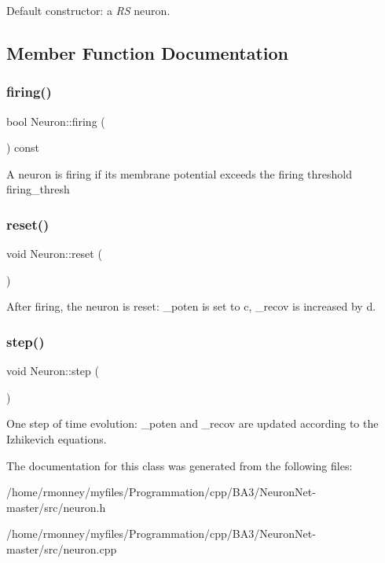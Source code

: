Default constructor\+: a {\itshape RS} neuron. 

\subsection{Member Function Documentation}
\mbox{\label{classNeuron_a4f477ebb623a7681c0f09dbfc4608a0d}} 
\subsubsection{\texorpdfstring{firing()}{firing()}}
{\footnotesize\ttfamily bool Neuron\+::firing (\begin{DoxyParamCaption}{ }\end{DoxyParamCaption}) const\hspace{0.3cm}{\ttfamily [inline]}}

A neuron is firing if its membrane potential exceeds the firing threshold firing\+\_\+thresh \mbox{\label{classNeuron_a6817fc5bf2128150b41b65e74f018408}} 
\subsubsection{\texorpdfstring{reset()}{reset()}}
{\footnotesize\ttfamily void Neuron\+::reset (\begin{DoxyParamCaption}{ }\end{DoxyParamCaption})\hspace{0.3cm}{\ttfamily [inline]}}

After firing, the neuron is reset\+: \+\_\+poten is set to {\ttfamily c}, \+\_\+recov is increased by {\ttfamily d}. \mbox{\label{classNeuron_a224d5cead5f94bbe15ae49774db3e174}} 
\subsubsection{\texorpdfstring{step()}{step()}}
{\footnotesize\ttfamily void Neuron\+::step (\begin{DoxyParamCaption}{ }\end{DoxyParamCaption})}

One step of time evolution\+: \+\_\+poten and \+\_\+recov are updated according to the Izhikevich equations. 

The documentation for this class was generated from the following files\+:\begin{DoxyCompactItemize}
\item 
/home/rmonney/myfiles/\+Programmation/cpp/\+B\+A3/\+Neuron\+Net-\/master/src/neuron.\+h\item 
/home/rmonney/myfiles/\+Programmation/cpp/\+B\+A3/\+Neuron\+Net-\/master/src/neuron.\+cpp\end{DoxyCompactItemize}
